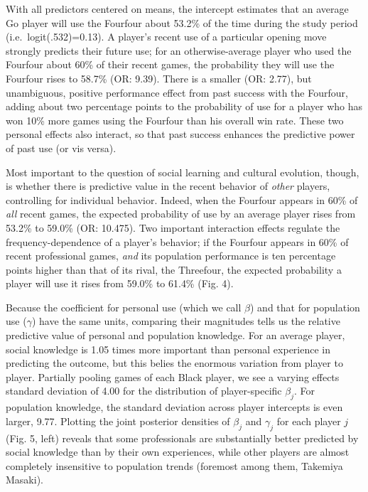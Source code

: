 \documentclass[reqno,12pt]{amsart}
\begin{document}
With all predictors centered on means, the intercept estimates that an
average Go player will use the Fourfour about 53.2\% of the time during
the study period (i.e.~logit(.532)=0.13). A player's recent use of a
particular opening move strongly predicts their future use; for an
otherwise-average player who used the Fourfour about 60\% of their
recent games, the probability they will use the Fourfour rises to 58.7\%
(OR: 9.39). There is a smaller (OR: 2.77), but unambiguous, positive
performance effect from past success with the Fourfour, adding about two
percentage points to the probability of use for a player who has won
10\% more games using the Fourfour than his overall win rate. These two
personal effects also interact, so that past success enhances the
predictive power of past use (or vis versa).

Most important to the question of social learning and cultural
evolution, though, is whether there is predictive value in the recent
behavior of \emph{other} players, controlling for individual behavior.
Indeed, when the Fourfour appears in 60\% of \emph{all} recent games,
the expected probability of use by an average player rises from 53.2\%
to 59.0\% (OR: 10.475). Two important interaction effects regulate the
frequency-dependence of a player's behavior; if the Fourfour appears in
60\% of recent professional games, \emph{and} its population performance
is ten percentage points higher than that of its rival, the Threefour,
the expected probability a player will use it rises from 59.0\% to
61.4\% (Fig. 4).

Because the coefficient for personal use (which we call \(\beta\)) and
that for population use (\(\gamma\)) have the same units, comparing
their magnitudes tells us the relative predictive value of personal and
population knowledge. For an average player, social knowledge is 1.05
times more important than personal experience in predicting the outcome,
but this belies the enormous variation from player to player. Partially
pooling games of each Black player, we see a varying effects standard
deviation of 4.00 for the distribution of player-specific \(\beta_j\).
For population knowledge, the standard deviation across player
intercepts is even larger, 9.77. Plotting the joint posterior densities
of \(\beta_j\) and \(\gamma_j\) for each player \(j\) (Fig. 5, left)
reveals that some professionals are substantially better predicted by
social knowledge than by their own experiences, while other players are
almost completely insensitive to population trends (foremost among them,
Takemiya Masaki).
\end{document}
